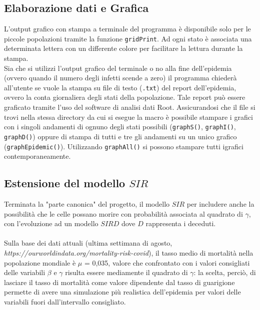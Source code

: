 \documentclass[a4paper]{article}
\begin{document}
\subsection{Elaborazione dati e Grafica}
L'output grafico con stampa a terminale del programma è disponibile solo per le piccole popolazioni tramite la funzione \texttt{gridPrint}. Ad ogni stato è associata una determinata lettera con un differente colore per facilitare la lettura durante la stampa. \\
Sia che si utilizzi l'output grafico del terminale o no alla fine dell'epidemia (ovvero quando il numero degli infetti scende a zero) il programma chiederà all'utente se vuole la stampa su file di testo (\texttt{.txt}) del report dell'epidemia, ovvero la conta giornaliera degli stati della popolazione. Tale report può essere graficato tramite l'uso del software di analisi dati Root. Assicurandosi che il file si trovi nella stessa directory da cui si esegue la macro è possibile stampare i grafici con i singoli andamenti di ognuno degli stati possibili (\texttt{graphS()}, \texttt{graphI()}, \texttt{graphD()}) oppure di stampa di tutti e tre gli andamenti su un unico grafico (\texttt{graphEpidemic()}). Utilizzando \texttt{graphAll()} si possono stampare tutti igrafici contemporaneamente.
\subsection{Estensione del modello $SIR$}
Terminata la "parte canonica" del progetto, il modello $SIR$ per includere anche la possibilità che le celle possano morire con probabilità associata al quadrato di $\gamma$, con l'evoluzione ad un modello $SIRD$ dove $D$ rappresenta i deceduti.\\ \\ Sulla base dei dati attuali (ultima settimana di agosto,\\ \textit{https://ourworldindata.org/mortality-risk-covid}), il tasso medio di mortalità nella popolazione mondiale è $\mu$ = 0,035, valore che confrontato con i valori consigliati delle variabili $\beta$ e $\gamma$ risulta essere mediamente il quadrato di $\gamma$: la scelta, perciò, di lasciare il tasso di mortalità come valore dipendente dal tasso di guarigione permette di avere una simulazione più realistica dell'epidemia per valori delle variabili fuori dall'intervallo consigliato. 
\\ \\
\end{document}
